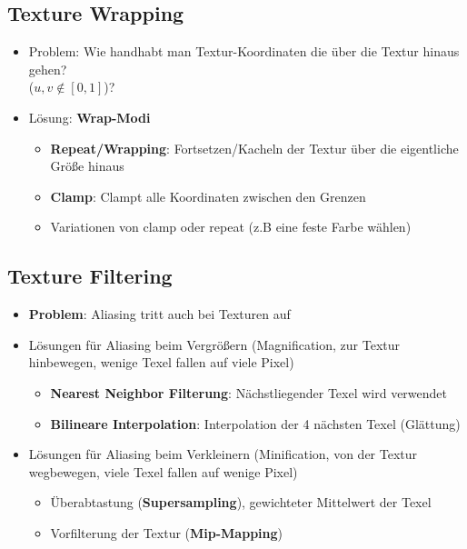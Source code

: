 \documentclass[10pt,a4paper]{article}
\begin{document}
	\subsection{Texture Wrapping}
	\label{sub:texture_wrapping}
	
	\begin{itemize}
		\item Problem: Wie handhabt man Textur-Koordinaten die über die Textur hinaus gehen?\\($u, v \notin [0, 1]$)?
		\item Lösung: \textbf{Wrap-Modi}
		\begin{itemize}
			\item \textbf{Repeat/Wrapping}: Fortsetzen/Kacheln der Textur über die eigentliche Größe hinaus
			\item \textbf{Clamp}: Clampt alle Koordinaten zwischen den Grenzen
			\item Variationen von clamp oder repeat (z.B eine feste Farbe wählen)
		\end{itemize}
	\end{itemize}

	\subsection{Texture Filtering}
	\label{sub:texture_filtering}
	
	\begin{itemize}
		\item \textbf{Problem}: Aliasing tritt auch bei Texturen auf
		\item Lösungen für Aliasing beim Vergrößern (Magnification, zur Textur hinbewegen, wenige Texel fallen auf viele Pixel)
		\begin{itemize}
			\item \textbf{Nearest Neighbor Filterung}: Nächstliegender Texel wird verwendet
			\item \textbf{Bilineare Interpolation}: Interpolation der 4 nächsten Texel (Glättung)
		\end{itemize}
		\item Lösungen für Aliasing beim Verkleinern (Minification, von der Textur wegbewegen, viele Texel fallen auf wenige Pixel)
		\begin{itemize}
			\item Überabtastung (\textbf{Supersampling}), gewichteter Mittelwert der Texel
			\item Vorfilterung der Textur (\textbf{Mip-Mapping})
		\end{itemize}
	\end{itemize}
\end{document}
